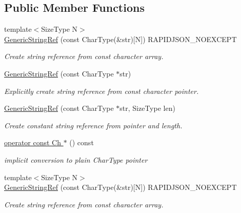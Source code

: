 \subsection*{Public Member Functions}
\begin{DoxyCompactItemize}
\item 
{\footnotesize template$<$Size\+Type N$>$ }\\\hyperlink{structGenericStringRef_aae0c070f914d2486a560150a927c22dc}{Generic\+String\+Ref} (const Char\+Type(\&str)\mbox{[}N\mbox{]}) R\+A\+P\+I\+D\+J\+S\+O\+N\+\_\+\+N\+O\+E\+X\+C\+E\+PT
\begin{DoxyCompactList}\small\item\em Create string reference from {\ttfamily const} character array. \end{DoxyCompactList}\item 
\hyperlink{structGenericStringRef_a9e80d81d5ad49cf0fb4128ace8c548d9}{Generic\+String\+Ref} (const Char\+Type $\ast$str)
\begin{DoxyCompactList}\small\item\em Explicitly create string reference from {\ttfamily const} character pointer. \end{DoxyCompactList}\item 
\hyperlink{structGenericStringRef_a8b2c6a7fdc4da1e7055f7fdcf0ac517f}{Generic\+String\+Ref} (const Char\+Type $\ast$str, Size\+Type len)
\begin{DoxyCompactList}\small\item\em Create constant string reference from pointer and length. \end{DoxyCompactList}\item 
\mbox{\label{structGenericStringRef_a4e652ee3a398d0eb8ece1835d15274d0}} 
\hyperlink{structGenericStringRef_a4e652ee3a398d0eb8ece1835d15274d0}{operator const Ch $\ast$} () const
\begin{DoxyCompactList}\small\item\em implicit conversion to plain Char\+Type pointer \end{DoxyCompactList}\item 
{\footnotesize template$<$Size\+Type N$>$ }\\\hyperlink{structGenericStringRef_aae0c070f914d2486a560150a927c22dc}{Generic\+String\+Ref} (const Char\+Type(\&str)\mbox{[}N\mbox{]}) R\+A\+P\+I\+D\+J\+S\+O\+N\+\_\+\+N\+O\+E\+X\+C\+E\+PT
\begin{DoxyCompactList}\small\item\em Create string reference from {\ttfamily const} character array. \end{DoxyCompactList}\item 

\end{DoxyCompactItemize}
